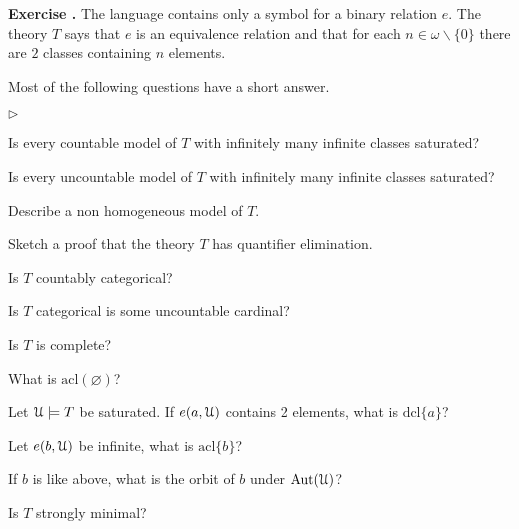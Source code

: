 \documentclass[10pt]{article}
\def\U{\EuScript U}
\def\sm{\smallsetminus}
\def\Aut{\textrm{Aut}}
\def\acl{\textrm{acl}}
\def\dcl{\textrm{dcl}}
\newcommand{\labella}[1]{{\sf\footnotesize #1}\hfill}
\renewenvironment{itemize}
  {\begin{list}{$\triangleright$}{%
   \setlength{\parskip}{0mm}
   \setlength{\topsep}{0mm}
   \setlength{\rightmargin}{0mm}
   \setlength{\listparindent}{0mm}
   \setlength{\itemindent}{0mm}
   \setlength{\labelwidth}{3ex}
   \setlength{\itemsep}{0mm}
   \setlength{\parsep}{0mm}
   \setlength{\partopsep}{0mm}
   \setlength{\labelsep}{1ex}
   \setlength{\leftmargin}{\labelwidth+\labelsep}
   \let\makelabel\labella}}{%
   \end{list}}
\newcounter{ex}
\newenvironment{exercise}{\bigskip\addtocounter{ex}{1}\textbf{Exercise \theex.\quad}}{}
\begin{document}
\begin{exercise}
The language contains only a symbol for a binary relation $e$. The theory $T$ says that $e$ is an equivalence relation and that for each $n\in\omega\sm\{0\}$ there are $2$ classes containing $n$ elements. 

Most of the following questions have a short answer.

\medskip
\begin{itemize}
\item[1.] Is every countable model of $T$ with infinitely many infinite classes saturated?
\item[2.] Is every uncountable model of $T$ with infinitely many infinite classes saturated?
\item[3.] Describe a non homogeneous model of $T$.
\item[4.] Sketch a proof that the theory $T$ has quantifier elimination.  
\item[5.] Is $T$ countably categorical? 
\item[6.] Is $T$ categorical is some uncountable cardinal?
\item[7.] Is $T$ is complete?
\item[8.] What is $\acl(\varnothing)$?
\item[9.] Let $\U\models T$ be saturated. If $e(a,\U)$ contains 2 elements, what is $\dcl\{a\}$?
\item[10.] Let $e(b,\U)$ be infinite, what is $\acl\{b\}$?
\item[11.] If $b$ is like above, what is the orbit of $b$ under $\Aut(\U)$?
\item[12.] Is $T$ strongly minimal?
\end{itemize}
\end{exercise}
\end{document}
